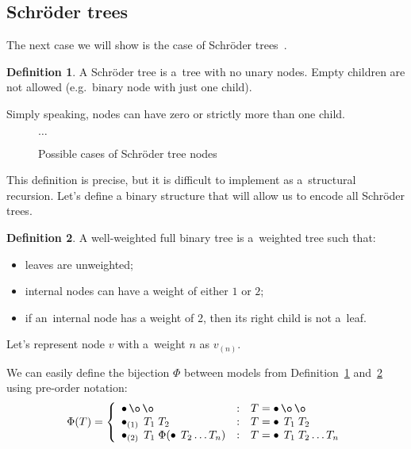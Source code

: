 \documentclass[final]{article}
\theoremstyle{definition}
\newtheorem{definition}{Definition}[subsection]
\theoremstyle{definition}
\theoremstyle{remark}
\newcommand{\weighted}[1]{\ensuremath{_{(#1)}}}
\DeclareMathOperator{\n}{\bullet}
\DeclareMathOperator{\no}{\o}
\begin{document}
\subsection{Schröder trees}%
\label{sub:schröder_trees}

The next case we will show is the case of Schröder trees~\cite{schroder}.

\begin{definition}%
    \label{def:schroder_tree}
    A Schröder tree is a~tree with no unary nodes. Empty children are not allowed (e.g.~binary node with just one child).
\end{definition}

Simply speaking, nodes can have zero or strictly more than one child.

\begin{figure}[H]
    \centering
    
    
    
    
    \(\ldots\)
    \caption{Possible cases of Schröder tree nodes}%
    \label{fig:schroder_trees}
\end{figure}

This definition is precise, but it is difficult to implement as a~structural recursion. Let's define a binary structure that will allow us to encode all Schröder trees.

\begin{definition}%
    \label{def:well_weighted}
    A well-weighted full binary tree is a~weighted tree such that:
    \begin{itemize}
        \item leaves are unweighted;
        \item internal nodes can have a weight of either \(1\) or \(2\);
        \item if an~internal node has a weight of 2, then its right child is not a~leaf.
    \end{itemize}
\end{definition}

Let's represent node \(v\) with a~weight \(n\) as \(v\weighted{n}\).

We can easily define the bijection \(\Phi\) between models from Definition~\ref{def:schroder_tree} and~\ref{def:well_weighted} using pre-order notation:
\[\Phi(T) = \left\{\begin{array}{lcl}
            \n \no \no &:& T = \n \no \no \\
            \n\weighted{1}\; T_1\; T_2 &:& T = \n\; T_1\; T_2\\
            \n\weighted{2}\; T_1\; \Phi(\n\; T_2 \ldots T_n) &:& T = \n\; T_1\; T_2 \ldots T_n
\end{array}\right.\]
\end{document}
